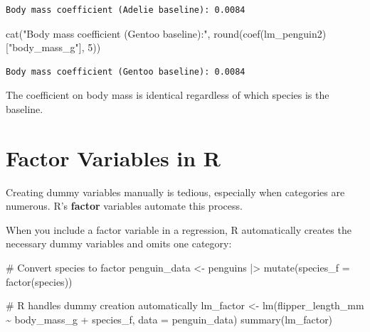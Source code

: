 \documentclass[
  letterpaper,
  DIV=11,
  numbers=noendperiod]{scrreprt}
\newenvironment{Shaded}{\begin{snugshade}}{\end{snugshade}}
\newcommand{\AttributeTok}[1]{\textcolor[rgb]{0.40,0.45,0.13}{#1}}
\newcommand{\CommentTok}[1]{\textcolor[rgb]{0.37,0.37,0.37}{#1}}
\newcommand{\DecValTok}[1]{\textcolor[rgb]{0.68,0.00,0.00}{#1}}
\newcommand{\FunctionTok}[1]{\textcolor[rgb]{0.28,0.35,0.67}{#1}}
\newcommand{\NormalTok}[1]{\textcolor[rgb]{0.00,0.23,0.31}{#1}}
\newcommand{\OtherTok}[1]{\textcolor[rgb]{0.00,0.23,0.31}{#1}}
\newcommand{\SpecialCharTok}[1]{\textcolor[rgb]{0.37,0.37,0.37}{#1}}
\newcommand{\StringTok}[1]{\textcolor[rgb]{0.13,0.47,0.30}{#1}}
\begin{document}
\begin{verbatim}
Body mass coefficient (Adelie baseline): 0.0084 
\end{verbatim}

\begin{Shaded}
\begin{Highlighting}[]
\FunctionTok{cat}\NormalTok{(}\StringTok{"Body mass coefficient (Gentoo baseline):"}\NormalTok{, }\FunctionTok{round}\NormalTok{(}\FunctionTok{coef}\NormalTok{(lm\_penguin2)[}\StringTok{"body\_mass\_g"}\NormalTok{], }\DecValTok{5}\NormalTok{))}
\end{Highlighting}
\end{Shaded}

\begin{verbatim}
Body mass coefficient (Gentoo baseline): 0.0084
\end{verbatim}

The coefficient on body mass is identical regardless of which species is
the baseline.

\section{Factor Variables in R}\label{factor-variables-in-r}

Creating dummy variables manually is tedious, especially when categories
are numerous. R's \textbf{factor} variables automate this process.

When you include a factor variable in a regression, R automatically
creates the necessary dummy variables and omits one category:

\begin{Shaded}
\begin{Highlighting}[]
\CommentTok{\# Convert species to factor}
\NormalTok{penguin\_data }\OtherTok{\textless{}{-}}\NormalTok{ penguins }\SpecialCharTok{|\textgreater{}} 
    \FunctionTok{mutate}\NormalTok{(}\AttributeTok{species\_f =} \FunctionTok{factor}\NormalTok{(species))}

\CommentTok{\# R handles dummy creation automatically}
\NormalTok{lm\_factor }\OtherTok{\textless{}{-}} \FunctionTok{lm}\NormalTok{(flipper\_length\_mm }\SpecialCharTok{\textasciitilde{}}\NormalTok{ body\_mass\_g }\SpecialCharTok{+}\NormalTok{ species\_f, }\AttributeTok{data =}\NormalTok{ penguin\_data)}
\FunctionTok{summary}\NormalTok{(lm\_factor)}
\end{Highlighting}
\end{Shaded}
\end{document}
